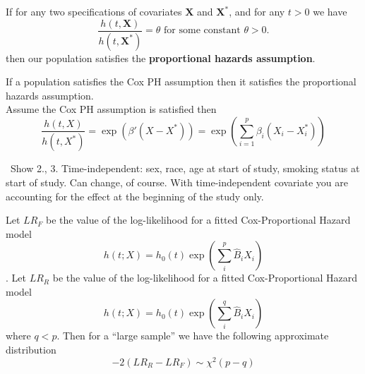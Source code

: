 \documentclass{article}
\begin{document}
%
%
%
%
%


 If for any two specifications of covariates $\mathbf{X}$ and $\mathbf{X}^*$, and for any $t>0$ we have
\[
\frac{h(t,\mathbf{X})}{h(t,\mathbf{X}^*)} = \theta \text{ for some constant } \theta > 0.
\]
then our population satisfies the \textbf{proportional hazards assumption}.

 If a population satisfies the Cox PH assumption then it satisfies the proportional hazards assumption. \\
Assume the Cox PH assumption is satisfied then
\[
\frac{h(t,X)}{h(t,X^*)}=\exp(\beta'(X-X^*)) = \exp\left(\sum_{i=1}^p  \beta_i(X_i-X_i^*)\right)
\]

\NTS \, Show 2.,  3. Time-independent: sex, race, age at start of study, smoking status at start of study. Can change, of course. With time-independent covariate you are accounting for the effect at the beginning of the study only.

 Let $LR_F$ be the value of the log-likelihood for a fitted Cox-Proportional Hazard model
\[ h(t;X) = h_0(t) \exp(\sum_i^p \hat{B}_iX_i) \].
Let $LR_R$ be the value of the log-likelihood for a fitted Cox-Proportional Hazard model
\[ h(t;X) = h_0(t) \exp(\sum_i^q \hat{B}_iX_i) \]
where $q<p$.
Then for a ``large sample'' we have the following approximate distribution
\[
-2(LR_R - LR_F) \sim \chi^2(p-q)
\]
\end{document}
